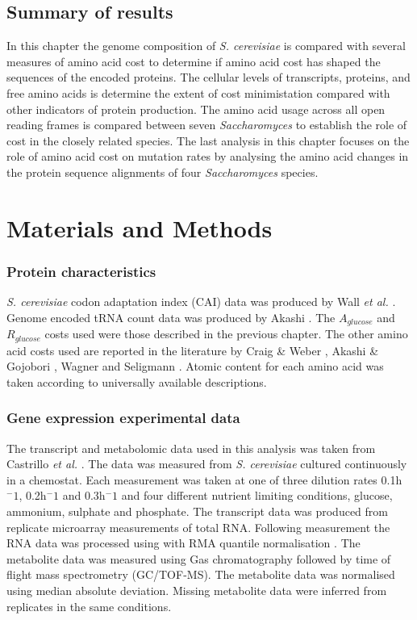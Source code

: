 \subsection{Summary of results}

In this chapter the genome composition of \emph{S. cerevisiae} is compared with several measures of amino acid cost to determine if amino acid cost has shaped the sequences of the encoded proteins. The cellular levels of transcripts, proteins, and free amino acids is determine the extent of cost minimistation compared with other indicators of protein production. The amino acid usage across all open reading frames is compared between seven \emph{Saccharomyces} to establish the role of cost in the closely related species. The last analysis in this chapter focuses on the role of amino acid cost on mutation rates by analysing the amino acid changes in the protein sequence alignments of four \emph{Saccharomyces} species.

\clearpage

\section{Materials and Methods}

\subsubsection{Protein characteristics}

\emph{S. cerevisiae} codon adaptation index (CAI) data was produced by Wall \emph{et al.} \cite{wall2005}. Genome encoded tRNA count data was produced by Akashi \cite{akashi2003}. The $A_{glucose}$ and $R_{glucose}$ costs used were those described in the previous chapter. The other amino acid costs used are reported in the literature by Craig \& Weber \cite{craig1998}, Akashi \& Gojobori \cite{akashi2002}, Wagner \cite{wagner2005} and Seligmann \cite{seligmann2003}. Atomic content for each amino acid was taken according to universally available descriptions.

\subsubsection{Gene expression experimental data}

The transcript and metabolomic data used in this analysis was taken from Castrillo \emph{et al.} \cite{castrillo2007}. The data was measured from \emph{S. cerevisiae} cultured continuously in a chemostat. Each measurement was taken at one of three dilution rates 0.1h$^-1$, 0.2h$^-1$ and 0.3h$^-1$ and four different nutrient limiting conditions, glucose, ammonium, sulphate and phosphate. The transcript data was produced from replicate microarray measurements of total RNA. Following measurement the RNA data was processed using with RMA quantile normalisation \cite{bolstad2003}. The metabolite data was measured using Gas chromatography followed by time of flight mass spectrometry (GC/TOF-MS). The metabolite data was normalised using median absolute deviation. Missing metabolite data were inferred from replicates in the same conditions.

